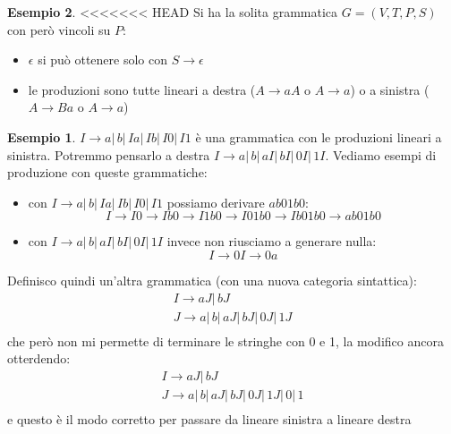 \documentclass[a4paper]{book}
\theoremstyle{definition}%
\newtheorem*{esempio}{Esempio}
\begin{document}
\begin{esempio}
<<<<<<< HEAD
  Si ha la solita grammatica $G = (V, T, P, S)$ con però vincoli su $P$:
  \begin{itemize}
  \item $\epsilon$ si può ottenere solo con $S\to \epsilon$
  \item le produzioni sono tutte lineari a destra ($A\to aA$ o $A\to a$) o a sinistra ($A\to Ba$ o $A\to a$)
  \end{itemize}
\begin{esempio}
$I\to a|\,b|\,Ia|\,Ib|\,I0|\,I1$ è una grammatica con le produzioni lineari a sinistra.\newline
Potremmo pensarlo a destra $I\to a|\,b|\,aI|\,bI|\,0I|\,1I$.\newline
Vediamo esempi di produzione con queste grammatiche:
\begin{itemize}
\item con $I\to a|\,b|\,Ia|\,Ib|\,I0|\,I1$ possiamo derivare $ab01b0$:
\[ I\to I0\to Ib0\to I1b0\to I01b0\to Ib01b0\to ab01b0 \]
\item con $I\to a|\,b|\,aI|\,bI|\,0I|\,1I$ invece non riusciamo a generare nulla:
\[ I\to 0I\to 0a \]
\end{itemize}
Definisco quindi un'altra grammatica (con una nuova categoria sintattica):
\[ \begin{aligned}
  I\to aJ|\, bJ \\
  J\to a|\,b|\,aJ|\,bJ|\,0J|\,1J\\
  \end{aligned} \]
che però non mi permette di terminare le stringhe con 0 e 1, la modifico ancora otterdendo:
\[ \begin{aligned}
  I\to aJ|\, bJ\\
  J\to a|\,b|\,aJ|\,bJ|\,0J|\,1J|\,0|\,1\\
  \end{aligned} \]
e questo è il modo corretto per passare da lineare sinistra a lineare destra
\end{esempio}


\end{esempio}
\end{document}
